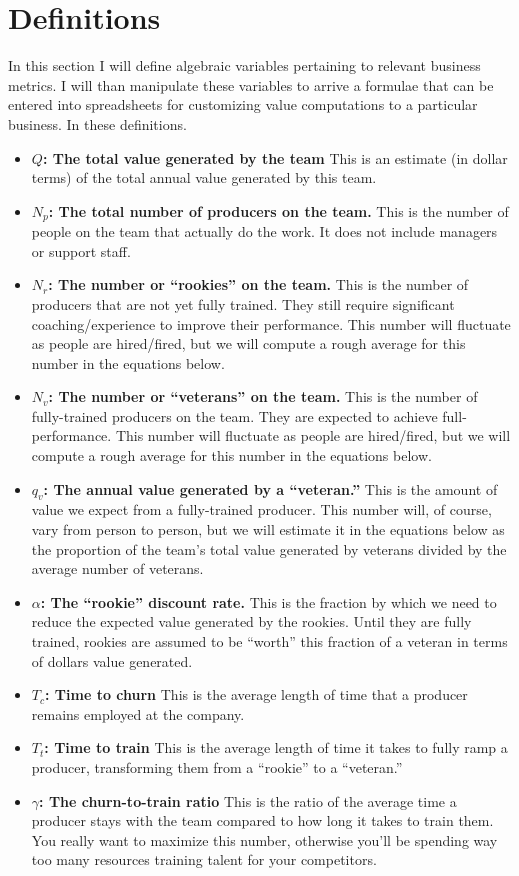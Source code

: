 \documentclass[paper=a4, fontsize=11pt abstract]{scrartcl}
\numberwithin{equation}{section}		%
\numberwithin{figure}{section}			%
\numberwithin{table}{section}				%
\begin{document}
\section{Definitions}
In this section I will define algebraic variables pertaining to relevant business metrics. I will than manipulate these variables to arrive a formulae that can be entered into spreadsheets for customizing value computations to a particular business.  In these definitions.
\begin{itemize}
    \item $Q$\textbf{: The total value generated by the team}  This is an estimate (in dollar terms) of the total annual value generated by this team.
    \item $N_p$\textbf{: The total number of producers on the team.}  This is the number of people on the team that actually do the work.  It does not include managers or support staff.
    \item $N_r$\textbf{: The number or ``rookies'' on the team.}  This is the number of producers that are not yet fully trained.  They still require significant coaching/experience to improve their performance. This number will fluctuate as people are hired/fired, but we will compute a rough average for this number in the equations below.
    \item $N_v$\textbf{: The number or ``veterans'' on the team.}  This is the number of fully-trained producers on the team. They are expected to achieve full-performance. This number will fluctuate as people are hired/fired, but we will compute a rough average for this number in the equations below.
    \item $q_v$\textbf{: The annual value generated by a ``veteran.''}  This is the amount of value we expect from a fully-trained producer.  This number will, of course, vary from person to person, but we will estimate it in the equations below as the proportion of the team's total value generated by veterans divided by the average number of veterans.
    \item $\alpha$\textbf{: The ``rookie'' discount rate.}  This is the fraction by which we need to reduce the expected value generated by the rookies.  Until they are fully trained, rookies are assumed to be ``worth'' this fraction of a veteran in terms of dollars value generated.
    \item $T_c$\textbf{: Time to churn} This is the average length of time that a producer remains employed at the company.
    \item $T_t$\textbf{: Time to train} This is the average length of time it takes to fully ramp a producer, transforming them from a ``rookie'' to a ``veteran.'' 
    \item $\gamma$\textbf{: The churn-to-train ratio} This is the ratio of the average time a producer stays with the team compared to how long it takes to train them.  You really want to maximize this number, otherwise you'll be spending way too many resources training talent for your competitors.
\end{itemize}
\end{document}
